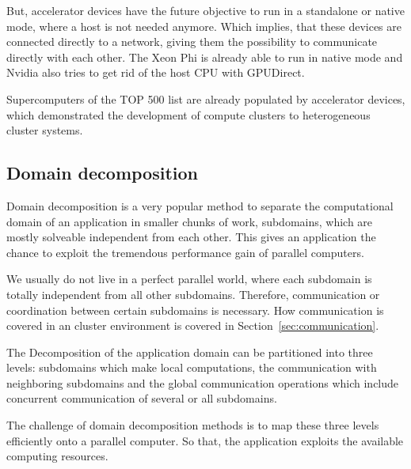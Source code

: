 But, accelerator devices have the future objective to run in a
standalone or native mode, where a host is not needed anymore.  Which
implies, that these devices are connected directly to a network,
giving them the possibility to communicate directly with each
other. The Xeon Phi is already able to run in native mode and Nvidia
also tries to get rid of the host CPU with GPUDirect.

Supercomputers of the TOP 500 list \cite{ref:top500} are already
populated by accelerator devices, which demonstrated the development
of compute clusters to heterogeneous cluster systems.


\subsection{Domain decomposition}
\label{sec:domain_decomposition}
Domain decomposition is a very popular method to separate the
computational domain of an application in smaller chunks of work,
subdomains, which are mostly solveable independent from each
other. This gives an application the chance to exploit the tremendous
performance gain of parallel computers.

We usually do not live in a perfect parallel world, where each
subdomain is totally independent from all other subdomains.
Therefore, communication or coordination between certain subdomains is
necessary. How communication is covered in an cluster environment
is covered in Section~\ref{sec:communication}.

The Decomposition of the application domain can be partitioned into three
levels: subdomains which make local computations, the
communication with neighboring subdomains and the global communication
operations which include concurrent communication of several or all
subdomains.

The challenge of domain decomposition methods is to map these three
levels efficiently onto a parallel computer. So that, the application
exploits the available computing resources.


